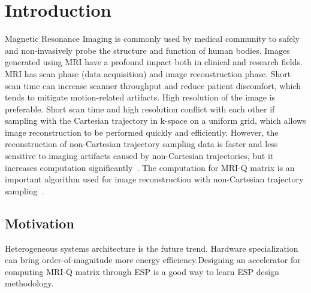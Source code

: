 \section{Introduction}
\label{sec:intro}
Magnetic Resonance Imaging is commonly used by medical community to safely and non-invasively probe the structure and function of human bodies. Images generated using MRI have a profound impact both in clinical and research fields. MRI has scan phase (data acquisition) and image reconstruction phase. Short scan time can increase scanner throughput and reduce patient discomfort, which tends to mitigate motion-related artifacts. High resolution of the image is preferable. Short scan time and high resolution conflict with each other if sampling with the Cartesian trajectory in k-space on a uniform grid, which allows image reconstruction to be performed quickly and efficiently. However, the reconstruction of non-Cartesian trajectory sampling data is faster and less sensitive to imaging artifacts caused by non-Cartesian trajectories, but it increases computation significantly~\cite{stone2008accelerating}. The computation for MRI-Q matrix is an important algorithm used for image reconstruction with non-Cartesian trajectory sampling~\cite{stratton2012parboil}.

\subsection{Motivation}
Heterogeneous systems architecture is the future trend. Hardware specialization can bring order-of-magnitude more energy efficiency.Designing an accelerator for computing MRI-Q matrix through ESP is a good way to learn ESP design methodology.
